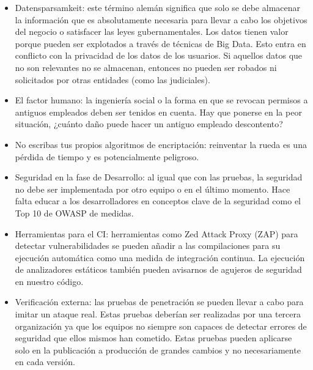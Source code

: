 \documentclass[11pt,a4paper]{article}
\begin{document}
\begin{itemize}

\item Datensparsamkeit: este término alemán significa que solo se debe almacenar la información que es absolutamente necesaria para llevar a cabo los objetivos del negocio o satisfacer las leyes gubernamentales. Los datos tienen valor porque pueden ser explotados a través de técnicas de Big Data. Esto entra en conflicto con la privacidad de los datos de los usuarios. Si aquellos datos que no son relevantes no se almacenan, entonces no pueden ser robados ni solicitados por otras entidades (como las judiciales).

\item El factor humano: la ingeniería social o la forma en que se revocan permisos a antiguos empleados deben ser tenidos en cuenta. Hay que ponerse en la peor situación, ¿cuánto daño puede hacer un antiguo empleado descontento?

\item No escribas tus propios algoritmos de encriptación: reinventar la rueda es una pérdida de tiempo y es potencialmente peligroso.

\item Seguridad en la fase de Desarrollo: al igual que con las pruebas, la seguridad no debe ser implementada por otro equipo o en el último momento. Hace falta educar a los desarrolladores en conceptos clave de la seguridad como el Top 10 de OWASP de medidas.

\item Herramientas para el CI: herramientas como Zed Attack Proxy (ZAP) para detectar vulnerabilidades se pueden añadir a las compilaciones para su ejecución automática como una medida de integración continua. La ejecución de analizadores estáticos también pueden avisarnos de agujeros de seguridad en nuestro código.

\item Verificación externa: las pruebas de penetración se pueden llevar a cabo para imitar un ataque real. Estas pruebas deberían ser realizadas por una tercera organización ya que los equipos no siempre son capaces de detectar errores de seguridad que ellos mismos han cometido. Estas pruebas pueden aplicarse solo en la publicación a producción de grandes cambios y no necesariamente en cada versión.

\end{itemize}
\end{document}
